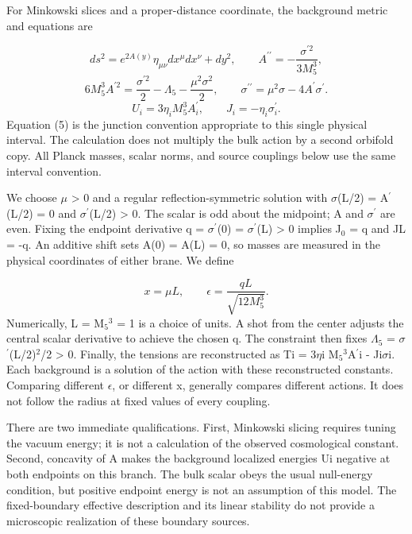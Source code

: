 \documentclass[11pt]{article}
\begin{document}
For Minkowski slices and a proper-distance coordinate, the background metric and equations are

\begin{equation}
ds^2=e^{2A(y)}\eta_{\mu\nu}dx^\mu dx^\nu+dy^2,\qquad A^{\prime\prime}=-\frac{\sigma^{\prime 2}}{3M_5^3},\tag{3}
\end{equation}
\begin{equation}
6M_5^3 A^{\prime 2}=\frac{\sigma^{\prime 2}}{2}-\Lambda_5-\frac{\mu^2\sigma^2}{2},\qquad \sigma^{\prime\prime}=\mu^2\sigma-4A^\prime\sigma^\prime.\tag{4}
\end{equation}
\begin{equation}
U_i=3\eta_i M_5^3 A_i^\prime,\qquad J_i=-\eta_i\sigma_i^\prime.\tag{5}
\end{equation}
Equation (5) is the junction convention appropriate to this single physical interval. The calculation does not multiply the bulk action by a second orbifold copy. All Planck masses, scalar norms, and source couplings below use the same interval convention.

We choose \(\mu\) > 0 and a regular reflection-symmetric solution with \(\sigma\)(L/2) = A\({}^\prime\)(L/2) = 0 and \(\sigma\)\({}^\prime\)(L/2) > 0. The scalar is odd about the midpoint; A and \(\sigma\)\({}^\prime\) are even. Fixing the endpoint derivative q = \(\sigma\)\({}^\prime\)(0) = \(\sigma\)\({}^\prime\)(L) > 0 implies J\({}_0\) = q and JL = -q. An additive shift sets A(0) = A(L) = 0, so masses are measured in the physical coordinates of either brane. We define

\begin{equation}
x=\mu L,\qquad \epsilon=\frac{qL}{\sqrt{12M_5^3}}.\tag{6}
\end{equation}
Numerically, L = M\({}_5\)\({}^3\) = 1 is a choice of units. A shot from the center adjusts the central scalar derivative to achieve the chosen q. The constraint then fixes \(\Lambda\)\({}_5\) = \(\sigma\)\({}^\prime\)(L/2)\({}^2\)/2 > 0. Finally, the tensions are reconstructed as Ti = 3\(\eta\)i M\({}_5\)\({}^3\)A\({}^\prime\)i - Ji\(\sigma\)i. Each background is a solution of the action with these reconstructed constants. Comparing different \(\epsilon\), or different x, generally compares different actions. It does not follow the radius at fixed values of every coupling.

There are two immediate qualifications. First, Minkowski slicing requires tuning the vacuum energy; it is not a calculation of the observed cosmological constant. Second, concavity of A makes the background localized energies Ui negative at both endpoints on this branch. The bulk scalar obeys the usual null-energy condition, but positive endpoint energy is not an assumption of this model. The fixed-boundary effective description and its linear stability do not provide a microscopic realization of these boundary sources.
\end{document}
